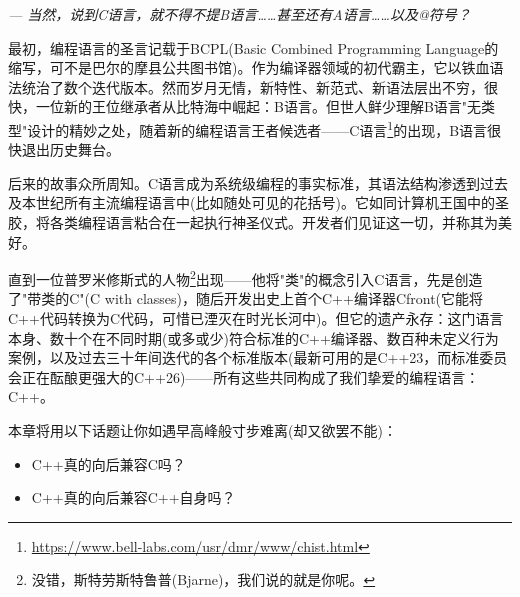 \begin{flushright}
\textit{--- 当然，说到C语言，就不得不提B语言……甚至还有A语言……以及@符号？}
\end{flushright}

最初，编程语言的圣言记载于BCPL(Basic Combined Programming Language的缩写，可不是巴尔的摩县公共图书馆)。作为编译器领域的初代霸主，它以铁血语法统治了数个迭代版本。然而岁月无情，新特性、新范式、新语法层出不穷，很快，一位新的王位继承者从比特海中崛起：B语言。但世人鲜少理解B语言"无类型"设计的精妙之处，随着新的编程语言王者候选者——C语言\footnote{\url{https://www.bell-labs.com/usr/dmr/www/chist.html}}的出现，B语言很快退出历史舞台。

后来的故事众所周知。C语言成为系统级编程的事实标准，其语法结构渗透到过去及本世纪所有主流编程语言中(比如随处可见的花括号)。它如同计算机王国中的圣胶，将各类编程语言粘合在一起执行神圣仪式。开发者们见证这一切，并称其为美好。

直到一位普罗米修斯式的人物\footnote{没错，斯特劳斯特鲁普(Bjarne)，我们说的就是你呢。}出现——他将"类"的概念引入C语言，先是创造了"带类的C"(C with classes)，随后开发出史上首个C++编译器Cfront(它能将C++代码转换为C代码，可惜已湮灭在时光长河中)。但它的遗产永存：这门语言本身、数十个在不同时期(或多或少)符合标准的C++编译器、数百种未定义行为案例，以及过去三十年间迭代的各个标准版本(最新可用的是C++23，而标准委员会正在酝酿更强大的C++26)——所有这些共同构成了我们挚爱的编程语言：C++。

本章将用以下话题让你如遇早高峰般寸步难离(却又欲罢不能)：

\begin{itemize}
\item 
C++真的向后兼容C吗？

\item 
C++真的向后兼容C++自身吗？
\end{itemize}

























